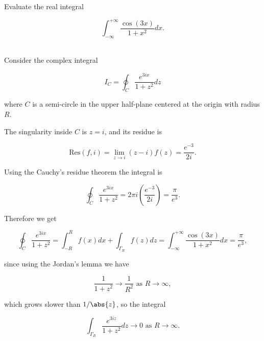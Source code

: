 \documentclass[english,a4paper,12pt]{report}
\begin{document}
{Evaluate the real integral 

\begin{equation}
    \int_{-\infty}^{+\infty} \frac{\cos (3x)}{1+x^2}dx.  
\end{equation}
~
}
{Consider the complex integral 

\begin{equation}
    I_{C} = \oint_{C} \frac{e^{3ix} }{1+z^2} dz
\end{equation}

where \(C\) is a semi-circle in the upper half-plane centered at the origin with radius \(R\).

The singularity inside \(C\) is \(z = i\), and its residue is

\begin{equation}
    \text{Res}(f,i) = \lim_{z \to i} (z-i)f(z) = \frac{e^{-3} }{2i}.   
\end{equation}

Using the Cauchy's residue theorem the integral is

\begin{equation}
      \oint_{C} \frac{e^{3ix} }{1+z^2} = 2\pi i \left( \frac{e^{-3} }{2i} \right) = \frac{\pi }{e^3}. 
\end{equation}

Therefore we get 

\begin{equation}
      \oint_{C} \frac{e^{3ix} }{1+z^2} = \int_{-R}^{R} f(x)dx + \int_{\Gamma _{R} }^{}f(z)dz  = \int_{-\infty}^{+\infty} \frac{\cos (3x)}{1+x^2}dx = \frac{\pi }{e^3},    
\end{equation}

since using the Jordan's lemma we have 

\begin{equation}
    \frac{1}{1+z^2} \to \frac{1}{R^2} \text{ as } R \to \infty ,  
\end{equation}

which grows slower than \(1 / \abs{z} \), so the integral 

\begin{equation}
    \int_{\Gamma _{R} }^{} \frac{e^{3iz} }{1+z^2} dz \to 0 \text{ as } R \to \infty.     
\end{equation}
~} 
\end{document}
